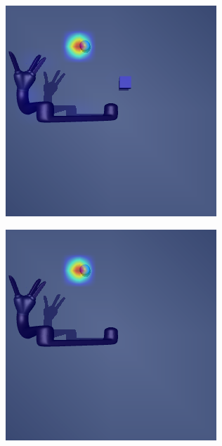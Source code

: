 \begin{figure}
  \begin{subfigure}{0.24\columnwidth}
    \includegraphics[width=\linewidth]{figures/chapter6/distractor_saliency_jaco_pro_off/shape_visual_random}
  \end{subfigure}
  \begin{subfigure}{0.24\columnwidth}
    \includegraphics[width=\linewidth]{figures/chapter6/distractor_saliency_jaco_pro_on/standard_sensor_random}

\end{subfigure}
\end{figure}

